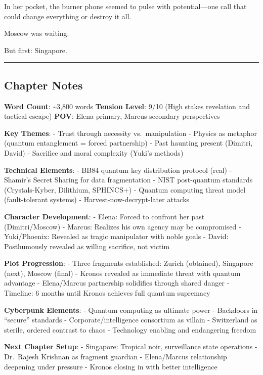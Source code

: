 In her pocket, the burner phone seemed to pulse with potential---one call that could change everything or destroy it all.

Moscow was waiting.

But first: Singapore.

\begin{center}\rule{0.5\linewidth}{0.5pt}\end{center}

\hypertarget{chapter-notes}{%
\subsection{Chapter Notes}\label{chapter-notes}}

\textbf{Word Count}: \textasciitilde3,800 words \textbf{Tension Level}: 9/10 (High stakes revelation and tactical escape) \textbf{POV}: Elena primary, Marcus secondary perspectives

\textbf{Key Themes}: - Trust through necessity vs.~manipulation - Physics as metaphor (quantum entanglement = forced partnership) - Past haunting present (Dimitri, David) - Sacrifice and moral complexity (Yuki's methods)

\textbf{Technical Elements}: - BB84 quantum key distribution protocol (real) - Shamir's Secret Sharing for data fragmentation - NIST post-quantum standards (Crystals-Kyber, Dilithium, SPHINCS+) - Quantum computing threat model (fault-tolerant systems) - Harvest-now-decrypt-later attacks

\textbf{Character Development}: - Elena: Forced to confront her past (Dimitri/Moscow) - Marcus: Realizes his own agency may be compromised - Yuki/Phoenix: Revealed as tragic manipulator with noble goals - David: Posthumously revealed as willing sacrifice, not victim

\textbf{Plot Progression}: - Three fragments established: Zurich (obtained), Singapore (next), Moscow (final) - Kronos revealed as immediate threat with quantum advantage - Elena/Marcus partnership solidifies through shared danger - Timeline: 6 months until Kronos achieves full quantum supremacy

\textbf{Cyberpunk Elements}: - Quantum computing as ultimate power - Backdoors in ``secure'' standards - Corporate/intelligence consortium as villain - Switzerland as sterile, ordered contrast to chaos - Technology enabling and endangering freedom

\textbf{Next Chapter Setup}: - Singapore: Tropical noir, surveillance state operations - Dr.~Rajesh Krishnan as fragment guardian - Elena/Marcus relationship deepening under pressure - Kronos closing in with better intelligence
